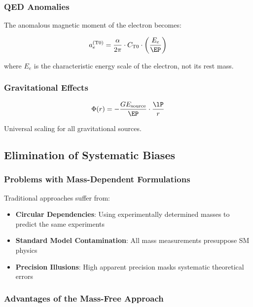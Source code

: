 	\subsubsection{QED Anomalies}
	
	The anomalous magnetic moment of the electron becomes:
	
	\begin{equation}
		a_e^{(\text{T0})} = \frac{\alpha}{2\pi} \cdot C_{\text{T0}} \cdot \left(\frac{E_e}{\EP}\right)
		\label{eq:qed_universal}
	\end{equation}
	
	where $E_e$ is the characteristic energy scale of the electron, not its rest mass.
	
	\subsubsection{Gravitational Effects}
	
	\begin{equation}
		\Phi(r) = -\frac{G E_{\text{source}}}{\EP} \cdot \frac{\lP}{r}
		\label{eq:gravity_universal}
	\end{equation}
	
	Universal scaling for all gravitational sources.
	
	\subsection{Elimination of Systematic Biases}
	\label{subsec:bias_elimination}
	
	\subsubsection{Problems with Mass-Dependent Formulations}
	
	Traditional approaches suffer from:
	\begin{itemize}
		\item \textbf{Circular Dependencies}: Using experimentally determined masses to predict the same experiments
		\item \textbf{Standard Model Contamination}: All mass measurements presuppose SM physics
		\item \textbf{Precision Illusions}: High apparent precision masks systematic theoretical errors
	\end{itemize}
	
	\subsubsection{Advantages of the Mass-Free Approach}
	
